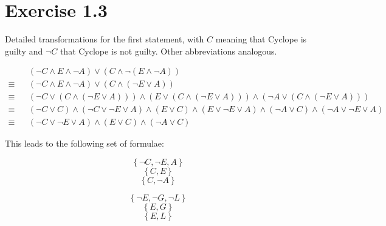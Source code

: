 \documentclass[a4paper]{article}
\begin{document}
\pagebreak


\section{Exercise 1.3}

Detailed transformations for the first statement, with $C$ meaning that Cyclope is guilty and
$\lnot C$ that Cyclope is not guilty. Other abbreviations analogous.


\begin{equation*}
\begin{aligned}
           & & \left( \lnot C \land E \land \lnot A \right) \lor \left( C \land \lnot \left( E \land \lnot A \right) \right) \\
    \equiv & & \left( \lnot C \land E \land \lnot A \right) \lor \left( C \land \left( \lnot E \lor A \right) \right) \\
    \equiv & & \left( \lnot C \lor \left( C \land \left( \lnot E \lor A \right) \right) \right)
               \land \left( E \lor \left( C \land \left( \lnot E \lor A \right) \right) \right)
               \land \left( \lnot A \lor \left( C \land \left( \lnot E \lor A \right) \right) \right) \\
    \equiv & & \left( \lnot C \lor C \right) \land \left( \lnot C \lor \lnot E \lor A \right)
               \land \left( E \lor C \right) \land \left( E \lor \lnot E \lor A \right)
               \land \left( \lnot A \lor C \right) \land \left( \lnot A \lor \lnot E \lor A \right) \\
    \equiv & & \left( \lnot C \lor \lnot E \lor A \right) \land \left( E \lor C \right) \land \left( \lnot A \lor C \right)
\end{aligned}
\end{equation*}

This leads to the following set of formulae:

\begin{equation}
 \left\{ \lnot C , \lnot E , A \right\} \tag{1.1} \label{1.1}
\end{equation}
\begin{equation}
\left\{ C , E \right\} \tag{1.2} \label{1.2}
\end{equation}
\begin{equation}
\left\{ C , \lnot A \right\} \tag{1.3} \label{1.3}
\end{equation}

\begin{equation}
 \left\{ \lnot E , \lnot G , \lnot L \right\} \tag{2.1} \label{2.1}
\end{equation}
\begin{equation}
\left\{ E , G \right\} \tag{3.2} \label{3.2}
\end{equation}
\begin{equation}
\left\{ E , L \right\} \tag{3.3} \label{3.3}
\end{equation}
\end{document}
